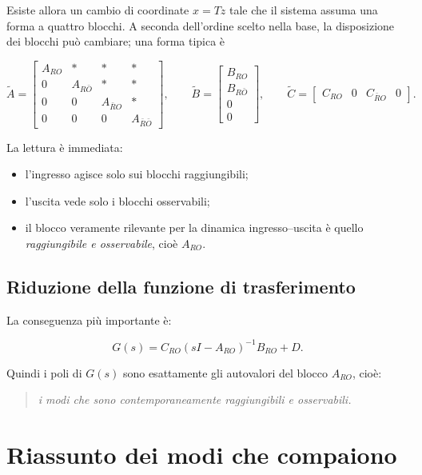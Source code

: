Esiste allora un cambio di coordinate \(x=Tz\) tale che il sistema assuma una forma a quattro blocchi.  
A seconda dell'ordine scelto nella base, la disposizione dei blocchi può cambiare; una forma tipica è

\[
\tilde A=
\begin{bmatrix}
A_{RO} & * & * & *\\
0 & A_{R\bar O} & * & *\\
0 & 0 & A_{\bar R O} & *\\
0 & 0 & 0 & A_{\bar R\bar O}
\end{bmatrix},
\qquad
\tilde B=
\begin{bmatrix}
B_{RO}\\
B_{R\bar O}\\
0\\
0
\end{bmatrix},
\qquad
\tilde C=
\begin{bmatrix}
C_{RO} & 0 & C_{\bar R O} & 0
\end{bmatrix}.
\]

La lettura è immediata:
\begin{itemize}
    \item l'ingresso agisce solo sui blocchi raggiungibili;
    \item l'uscita vede solo i blocchi osservabili;
    \item il blocco veramente rilevante per la dinamica ingresso--uscita è quello \emph{raggiungibile e osservabile}, cioè \(A_{RO}\).
\end{itemize}

\subsection{Riduzione della funzione di trasferimento}

La conseguenza più importante è:

\[
G(s)=C_{RO}(sI-A_{RO})^{-1}B_{RO}+D.
\]

Quindi i poli di \(G(s)\) sono esattamente gli autovalori del blocco \(A_{RO}\), cioè:

\begin{quote}
\emph{i modi che sono contemporaneamente raggiungibili e osservabili.}
\end{quote}

\section{Riassunto dei modi che compaiono}

